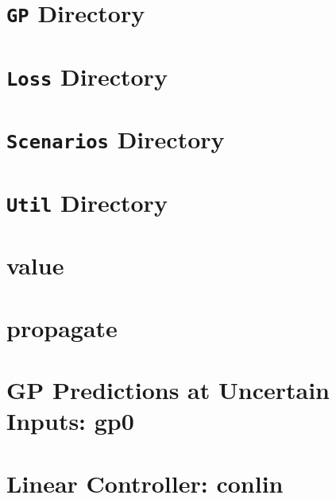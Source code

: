 \documentclass{article}
\begin{document}
\section{\texttt{GP} Directory}


\section{\texttt{Loss} Directory}

\section{\texttt{Scenarios} Directory}


\section{\texttt{Util} Directory}


\section{value}



\section{propagate}


\section{GP Predictions at Uncertain Inputs: gp0}



\section{Linear Controller: conlin}

\end{document}
